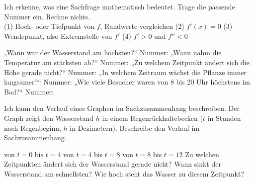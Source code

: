 \setcounter{aufgabe}{36}

\begin{aufgabe}{Ich erkenne, was eine Sachfrage mathematisch bedeutet.}
Trage die passende Nummer ein. Rechne nichts.\\
(1) Hoch- oder Tiefpunkt von $f$, Randwerte vergleichen \quad (2) $f'(x) = 0$ \quad (3) Wendepunkt, also Extremstelle von $f'$ \quad (4) $f' > 0$ und $f'' < 0$
\begin{teile}
\teil „Wann war der Wasserstand am höchsten?“ \hfill Nummer: \leerfeld
\teil „Wann nahm die Temperatur am stärksten ab?“ \hfill Nummer: \leerfeld
\teil „Zu welchem Zeitpunkt ändert sich die Höhe gerade nicht?“ \hfill Nummer: \leerfeld
\teil „In welchem Zeitraum wächst die Pflanze immer langsamer?“ \hfill Nummer: \leerfeld
\teil „Wie viele Besucher waren von 8 bis 20 Uhr höchstens im Bad?“ \hfill Nummer: \leerfeld
\end{teile}
\end{aufgabe}

\begin{aufgabe}{Ich kann den Verlauf eines Graphen im Sachzusammenhang beschreiben.}
Der Graph zeigt den Wasserstand $h$ in einem Regenrückhaltebecken ($t$ in Stunden nach Regenbeginn, $h$ in Dezimetern). Beschreibe den Verlauf im Sachzusammenhang.

\begin{ksys}[xmin=0,xmax=12,ymin=0,ymax=20,ystep=2,ablesen,xlabel=$t$,ylabel=$h(t)$]
\end{ksys}

\begin{teile}
\teil von $t = 0$ bis $t = 4$
\teil von $t = 4$ bis $t = 8$
\teil von $t = 8$ bis $t = 12$
\teil Zu welchen Zeitpunkten ändert sich der Wasserstand gerade nicht? \leerfeld
{}
\teil Wann sinkt der Wasserstand am schnellsten? \leerfeld
\teil Wie hoch steht das Wasser zu diesem Zeitpunkt? \leerfeld
\end{teile}
\end{aufgabe}

